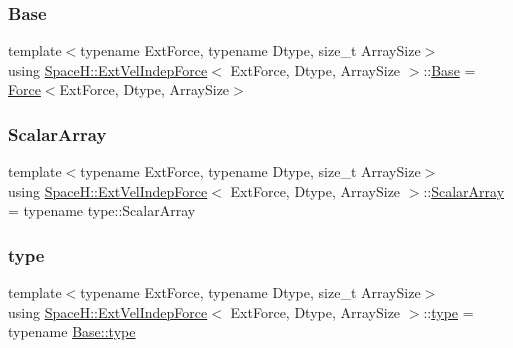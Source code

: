 \subsubsection{\texorpdfstring{Base}{Base}}
{\footnotesize\ttfamily template$<$typename Ext\+Force, typename Dtype, size\+\_\+t Array\+Size$>$ \\
using \mbox{\hyperlink{struct_space_h_1_1_ext_vel_indep_force}{Space\+H\+::\+Ext\+Vel\+Indep\+Force}}$<$ Ext\+Force, Dtype, Array\+Size $>$\+::\mbox{\hyperlink{struct_space_h_1_1_ext_vel_indep_force_acf786913cd012bc90bb02f9ae1f87e91}{Base}} =  \mbox{\hyperlink{struct_space_h_1_1_force}{Force}}$<$Ext\+Force, Dtype, Array\+Size$>$}

\mbox{\label{struct_space_h_1_1_ext_vel_indep_force_afe9c9f6c747f7b82f5e1058f5df2f2af}} 
\subsubsection{\texorpdfstring{Scalar\+Array}{ScalarArray}}
{\footnotesize\ttfamily template$<$typename Ext\+Force, typename Dtype, size\+\_\+t Array\+Size$>$ \\
using \mbox{\hyperlink{struct_space_h_1_1_ext_vel_indep_force}{Space\+H\+::\+Ext\+Vel\+Indep\+Force}}$<$ Ext\+Force, Dtype, Array\+Size $>$\+::\mbox{\hyperlink{struct_space_h_1_1_ext_vel_indep_force_afe9c9f6c747f7b82f5e1058f5df2f2af}{Scalar\+Array}} =  typename type\+::\+Scalar\+Array}

\mbox{\label{struct_space_h_1_1_ext_vel_indep_force_a6db7150bace18b57cb059989c7f29e50}} 
\subsubsection{\texorpdfstring{type}{type}}
{\footnotesize\ttfamily template$<$typename Ext\+Force, typename Dtype, size\+\_\+t Array\+Size$>$ \\
using \mbox{\hyperlink{struct_space_h_1_1_ext_vel_indep_force}{Space\+H\+::\+Ext\+Vel\+Indep\+Force}}$<$ Ext\+Force, Dtype, Array\+Size $>$\+::\mbox{\hyperlink{struct_space_h_1_1_ext_vel_indep_force_a6db7150bace18b57cb059989c7f29e50}{type}} =  typename \mbox{\hyperlink{struct_space_h_1_1_force_a151c6ae1ec7ad87825c2b6cc74aee5f2}{Base\+::type}}}

